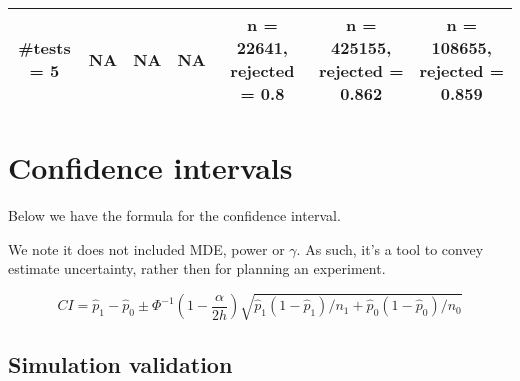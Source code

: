 \documentclass[
]{article}
\begin{document}
\begin{longtable}[]{@{}ccccccc@{}}
\begin{minipage}[t]{0.09\columnwidth}\centering
\textbf{\#tests = 5}\strut
\end{minipage} & \begin{minipage}[t]{0.08\columnwidth}\centering
NA\strut
\end{minipage} & \begin{minipage}[t]{0.08\columnwidth}\centering
NA\strut
\end{minipage} & \begin{minipage}[t]{0.08\columnwidth}\centering
NA\strut
\end{minipage} & \begin{minipage}[t]{0.15\columnwidth}\centering
n = 22641, rejected = 0.8\strut
\end{minipage} & \begin{minipage}[t]{0.16\columnwidth}\centering
n = 425155, rejected = 0.862\strut
\end{minipage} & \begin{minipage}[t]{0.16\columnwidth}\centering
n = 108655, rejected = 0.859\strut
\end{minipage}\tabularnewline
\bottomrule
\end{longtable}

\hypertarget{confidence-intervals}{%
\section{Confidence intervals}\label{confidence-intervals}}

Below we have the formula for the confidence interval.

We note it does not included MDE, power or \(\gamma\). As such, it's a
tool to convey estimate uncertainty, rather then for planning an
experiment.

\[\boxed{CI = \hat{p}_1-\hat{p}_0 \pm \Phi^{-1}(1-\frac{\alpha}{2h})\sqrt{\hat{p}_1(1-\hat{p}_1)/n_1+\hat{p}_0(1-\hat{p}_0)/n_0}}\]

\hypertarget{simulation-validation-4}{%
\subsection{Simulation validation}\label{simulation-validation-4}}
\end{document}
